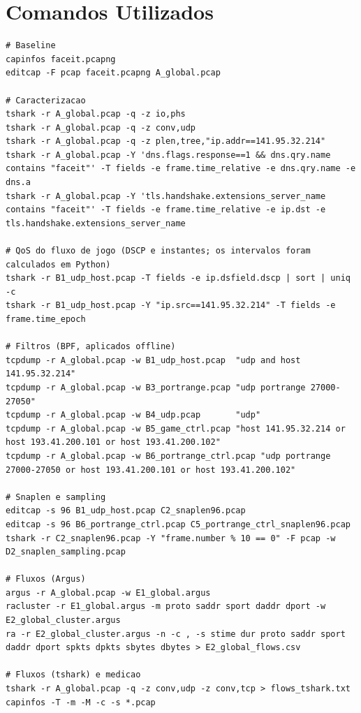 \documentclass[11pt,a4paper]{article}
\begin{document}
\section{Comandos Utilizados}
\begin{lstlisting}
# Baseline
capinfos faceit.pcapng
editcap -F pcap faceit.pcapng A_global.pcap

# Caracterizacao
tshark -r A_global.pcap -q -z io,phs
tshark -r A_global.pcap -q -z conv,udp
tshark -r A_global.pcap -q -z plen,tree,"ip.addr==141.95.32.214"
tshark -r A_global.pcap -Y 'dns.flags.response==1 && dns.qry.name contains "faceit"' -T fields -e frame.time_relative -e dns.qry.name -e dns.a
tshark -r A_global.pcap -Y 'tls.handshake.extensions_server_name contains "faceit"' -T fields -e frame.time_relative -e ip.dst -e tls.handshake.extensions_server_name

# QoS do fluxo de jogo (DSCP e instantes; os intervalos foram calculados em Python)
tshark -r B1_udp_host.pcap -T fields -e ip.dsfield.dscp | sort | uniq -c
tshark -r B1_udp_host.pcap -Y "ip.src==141.95.32.214" -T fields -e frame.time_epoch

# Filtros (BPF, aplicados offline)
tcpdump -r A_global.pcap -w B1_udp_host.pcap  "udp and host 141.95.32.214"
tcpdump -r A_global.pcap -w B3_portrange.pcap "udp portrange 27000-27050"
tcpdump -r A_global.pcap -w B4_udp.pcap       "udp"
tcpdump -r A_global.pcap -w B5_game_ctrl.pcap "host 141.95.32.214 or host 193.41.200.101 or host 193.41.200.102"
tcpdump -r A_global.pcap -w B6_portrange_ctrl.pcap "udp portrange 27000-27050 or host 193.41.200.101 or host 193.41.200.102"

# Snaplen e sampling
editcap -s 96 B1_udp_host.pcap C2_snaplen96.pcap
editcap -s 96 B6_portrange_ctrl.pcap C5_portrange_ctrl_snaplen96.pcap
tshark -r C2_snaplen96.pcap -Y "frame.number % 10 == 0" -F pcap -w D2_snaplen_sampling.pcap

# Fluxos (Argus)
argus -r A_global.pcap -w E1_global.argus
racluster -r E1_global.argus -m proto saddr sport daddr dport -w E2_global_cluster.argus
ra -r E2_global_cluster.argus -n -c , -s stime dur proto saddr sport daddr dport spkts dpkts sbytes dbytes > E2_global_flows.csv

# Fluxos (tshark) e medicao
tshark -r A_global.pcap -q -z conv,udp -z conv,tcp > flows_tshark.txt
capinfos -T -m -M -c -s *.pcap
\end{lstlisting}
\end{document}
